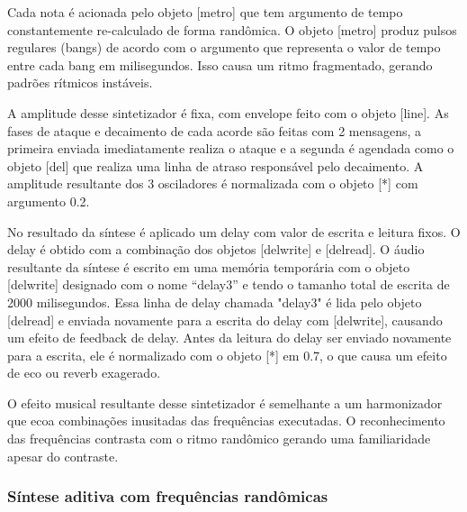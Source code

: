 \documentclass{ppgmus}
\begin{document}
Cada nota é acionada pelo objeto [metro] que tem argumento de tempo constantemente
re-calculado de forma randômica. O objeto [metro] produz pulsos regulares (bangs) de
acordo com o argumento que representa o valor de tempo entre cada bang em milisegundos.
Isso causa um ritmo fragmentado, gerando padrões rítmicos instáveis.

A amplitude desse sintetizador é fixa, com envelope feito com o
objeto [line\texttildelow]. As fases de ataque e decaimento de cada acorde 
são feitas com 2 mensagens, a primeira enviada imediatamente realiza o ataque 
e a segunda é agendada como o objeto [del] que realiza uma linha de atraso
responsável pelo decaimento. A amplitude resultante dos 3 osciladores é normalizada
com o objeto [*\texttildelow] com argumento 0.2.

No resultado da síntese é aplicado um delay com valor de escrita e leitura fixos.
O delay é obtido com a combinação dos objetos [delwrite\texttildelow] e 
[delread\texttildelow]. O áudio resultante da síntese é escrito em uma memória 
temporária com o objeto [delwrite\texttildelow] designado com o nome ``delay3'' 
e tendo o tamanho total de escrita de 2000 milisegundos. Essa linha de delay
chamada "delay3" é lida pelo objeto [delread\texttildelow] e enviada
novamente para a escrita do delay com [delwrite\texttildelow], causando um
efeito de feedback de delay. Antes da leitura do delay ser enviado novamente
para a escrita, ele é normalizado com o objeto [*\texttildelow] em 0.7, o
que causa um efeito de eco ou reverb exagerado. 

O efeito musical resultante desse sintetizador é semelhante a um harmonizador que ecoa combinações inusitadas
das frequências executadas. O reconhecimento das frequências contrasta com o
ritmo randômico gerando uma familiaridade apesar do contraste.



\subsubsection{Síntese aditiva com frequências randômicas}
\end{document}
